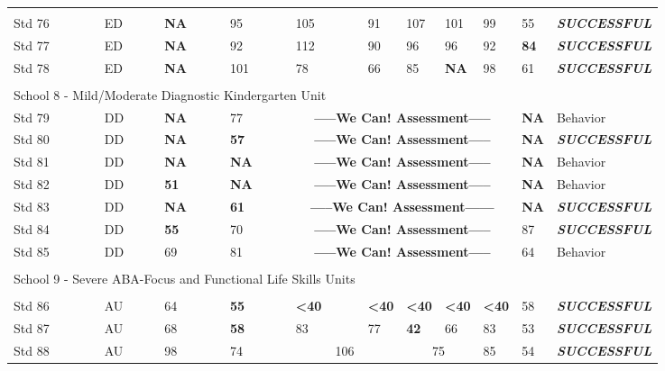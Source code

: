 \documentclass[twoside]{article}
\begin{document}
\begin{tiny}
\begin{landscape}
\begin{longtable}{p{1.5cm}p{1.5cm}p{1.5cm}p{1.5cm}p{1.75cm}p{1.75cm}p{1.75cm}p{1.75cm}p{1.75cm}p{1.75cm}p{2.5cm}@{}}
\hline\\
Std 76 & ED & \textbf{NA} & 95 & 105 & 91 & 107 & 101 & 99 & 55 & \textbf{\textit{SUCCESSFUL}} \\
Std 77 & ED & \textbf{NA} & 92 & 112 & 90 & 96 & 96 & 92 & \textbf{84} & \textbf{\textit{SUCCESSFUL}} \\
Std 78 & ED & \textbf{NA} & 101 & 78 & 66 & 85 & \textbf{NA} & 98 & 61 & \textbf{\textit{SUCCESSFUL}}\\
\hline \\
%
\multicolumn {5}{l}{School 8 - Mild/Moderate Diagnostic Kindergarten Unit} & & & & & & \\
\cmidrule(lr){1-2}
Std 79 & DD & \textbf{NA} & 77 & \multicolumn{5}{c}{\textbf{-----We Can! Assessment-----}} & \textbf{NA} & Behavior \\
Std 80 & DD & \textbf{NA} & \textbf{57} & \multicolumn{5}{c}{\textbf{-----We Can! Assessment-----}} & \textbf{NA} & \textbf{\textit{SUCCESSFUL}}\\
Std 81 & DD & \textbf{NA} & \textbf{NA} & \multicolumn{5}{c}{\textbf{-----We Can! Assessment-----}} & \textbf{NA} & Behavior \\
Std 82 & DD & \textbf{51} & \textbf{NA} & \multicolumn{5}{c}{\textbf{-----We Can! Assessment-----}} & \textbf{NA} & Behavior \\
Std 83 & DD & \textbf{NA} & \textbf{61} & \multicolumn{5}{c}{\textbf{-----We Can! Assessment------}} & \textbf{NA} & \textbf{\textit{SUCCESSFUL}}\\
Std 84 & DD & \textbf{55} & 70 & \multicolumn{5}{c}{\textbf{-----We Can! Assessment-----}} & 87 & \textbf{\textit{SUCCESSFUL}}\\
Std 85 & DD & 69 & 81 & \multicolumn{5}{c}{\textbf{-----We Can! Assessment-----}} & 64 & Behavior \\
\hline\\
%
\multicolumn {5}{l}{School 9 - Severe ABA-Focus and Functional Life Skills Units} & & & & & &\\
\hline \\
\cmidrule(lr){1-2}
Std 86  & AU & 64 & \textbf{55} & \textbf{\textless40} & \textbf{\textless40} & \textbf{\textless40} & \textbf{\textless40} & \textbf{\textless40} & 58 & \textbf{\textit{SUCCESSFUL}}\\
Std 87 & AU & 68 & \textbf{58} & 83 & 77 & \textbf{42} & 66 & 83 & 53 & \textbf{\textit{SUCCESSFUL}}\\
Std 88 & AU & 98 & 74 & \multicolumn{2}{c}{106} & \multicolumn{2}{c}{75} & 85 & 54 & \textbf{\textit{SUCCESSFUL}}\\

\end{longtable}
\end{landscape}
\end{tiny}
\end{document}
